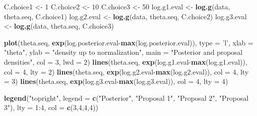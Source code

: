 \documentclass[]{article}
\newenvironment{Shaded}{\begin{snugshade}}{\end{snugshade}}
\newcommand{\KeywordTok}[1]{\textcolor[rgb]{0.13,0.29,0.53}{\textbf{{#1}}}}
\newcommand{\DataTypeTok}[1]{\textcolor[rgb]{0.13,0.29,0.53}{{#1}}}
\newcommand{\DecValTok}[1]{\textcolor[rgb]{0.00,0.00,0.81}{{#1}}}
\newcommand{\StringTok}[1]{\textcolor[rgb]{0.31,0.60,0.02}{{#1}}}
\newcommand{\NormalTok}[1]{{#1}}
\begin{document}
\begin{Shaded}
\begin{Highlighting}[]
\NormalTok{C.choice1 <-}\StringTok{ }\DecValTok{1}
\NormalTok{C.choice2 <-}\StringTok{ }\DecValTok{10}
\NormalTok{C.choice3 <-}\StringTok{ }\DecValTok{50}
\NormalTok{log.g1.eval <-}\StringTok{ }\KeywordTok{log.g}\NormalTok{(data, theta.seq, C.choice1)}
\NormalTok{log.g2.eval <-}\StringTok{ }\KeywordTok{log.g}\NormalTok{(data, theta.seq, C.choice2)}
\NormalTok{log.g3.eval <-}\StringTok{ }\KeywordTok{log.g}\NormalTok{(data, theta.seq, C.choice3)}

\KeywordTok{plot}\NormalTok{(theta.seq, }\KeywordTok{exp}\NormalTok{(log.posterior.eval-}\KeywordTok{max}\NormalTok{(log.posterior.eval)),}
     \DataTypeTok{type =} \StringTok{'l'}\NormalTok{, }\DataTypeTok{xlab =} \StringTok{"theta"}\NormalTok{, }\DataTypeTok{ylab =} \StringTok{"density up to normalization"}\NormalTok{,}
     \DataTypeTok{main =} \StringTok{"Posterior and proposal densities"}\NormalTok{, }\DataTypeTok{col =} \DecValTok{3}\NormalTok{, }\DataTypeTok{lwd =} \DecValTok{2}\NormalTok{)}
\KeywordTok{lines}\NormalTok{(theta.seq, }\KeywordTok{exp}\NormalTok{(log.g1.eval-}\KeywordTok{max}\NormalTok{(log.g1.eval)), }\DataTypeTok{col =} \DecValTok{4}\NormalTok{, }\DataTypeTok{lty =} \DecValTok{2}\NormalTok{)}
\KeywordTok{lines}\NormalTok{(theta.seq, }\KeywordTok{exp}\NormalTok{(log.g2.eval-}\KeywordTok{max}\NormalTok{(log.g2.eval)), }\DataTypeTok{col =} \DecValTok{4}\NormalTok{, }\DataTypeTok{lty =} \DecValTok{3}\NormalTok{)}
\KeywordTok{lines}\NormalTok{(theta.seq, }\KeywordTok{exp}\NormalTok{(log.g3.eval-}\KeywordTok{max}\NormalTok{(log.g3.eval)), }\DataTypeTok{col =} \DecValTok{4}\NormalTok{, }\DataTypeTok{lty =} \DecValTok{4}\NormalTok{)}

\KeywordTok{legend}\NormalTok{(}\StringTok{"topright"}\NormalTok{, }\DataTypeTok{legend =} \KeywordTok{c}\NormalTok{(}\StringTok{"Posterior"}\NormalTok{, }\StringTok{"Proposal 1"}\NormalTok{, }\StringTok{"Proposal 2"}\NormalTok{, }\StringTok{"Proposal 3"}\NormalTok{),}
       \DataTypeTok{lty =} \DecValTok{1}\NormalTok{:}\DecValTok{4}\NormalTok{, }\DataTypeTok{col =} \KeywordTok{c}\NormalTok{(}\DecValTok{3}\NormalTok{,}\DecValTok{4}\NormalTok{,}\DecValTok{4}\NormalTok{,}\DecValTok{4}\NormalTok{))}
\end{Highlighting}
\end{Shaded}
\end{document}
